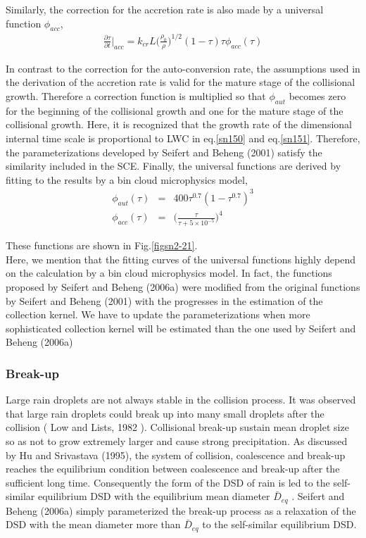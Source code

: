 Similarly, the correction for the accretion rate is also made by a universal function $\phi_{acc}$,
\begin{eqnarray}
\frac{\partial \tau}{\partial t}\Bigr|_{acc}=k_{cr}L\bigl(\frac{\rho_{0}}{\rho}\bigr)^{1/2}(1-\tau)\tau\phi_{acc}(\tau)\label{sn151}
\end{eqnarray}

In contrast to the correction for the auto-conversion rate, the assumptions used in the derivation of the accretion rate is valid for the mature stage of the collisional growth. Therefore a correction function is multiplied so that $\phi_{aut}$ becomes zero for the beginning of the collisional growth and one for the mature stage of the collisional growth. Here, it is recognized that the growth rate of the dimensional internal time scale is proportional to LWC in eq.\ref{sn150} and eq.\ref{sn151}. Therefore, the parameterizations developed by Seifert and Beheng (2001) satisfy the similarity included in the SCE. Finally, the universal functions are derived by fitting to the results by a bin cloud microphysics model,
\begin{eqnarray}
\phi_{aut}(\tau)&=&400\tau^{0.7}(1-\tau^{0.7})^{3}\label{152}\\
\phi_{acc}(\tau)&=&\bigl(\frac{\tau}{\tau+5\times 10^{-5}}\bigr)^{4}\label{153}
\end{eqnarray}

These functions are shown in Fig.\ref{figsn2-21}.\\
Here, we mention that the fitting curves of the universal functions highly depend on the calculation by a bin cloud microphysics model. In fact, the functions proposed by Seifert and Beheng (2006a) were modified from the original functions by Seifert and Beheng (2001) with the progresses in the estimation of the collection kernel. We have to update the parameterizations when more sophisticated collection kernel will be estimated than the one used by Seifert and Beheng (2006a)

\subsubsection{Break-up}
Large rain droplets are not always stable in the collision process. It was observed that large rain droplets could break up into many small droplets after the collision ( Low and Lists, 1982 ). Collisional break-up sustain mean droplet size so as not to grow extremely larger and cause strong precipitation. As discussed by Hu and Srivastava (1995), the system of collision, coalescence and break-up reaches the equilibrium condition between coalescence and break-up after the sufficient long time. Consequently the form of the DSD of rain is led to the self-similar equilibrium DSD with the equilibrium mean diameter $\bar{D}_{eq}$ . Seifert and Beheng (2006a) simply parameterized the break-up process as a relaxation of the DSD with the mean diameter more than $\bar{D}_{eq}$ to the self-similar equilibrium DSD.

